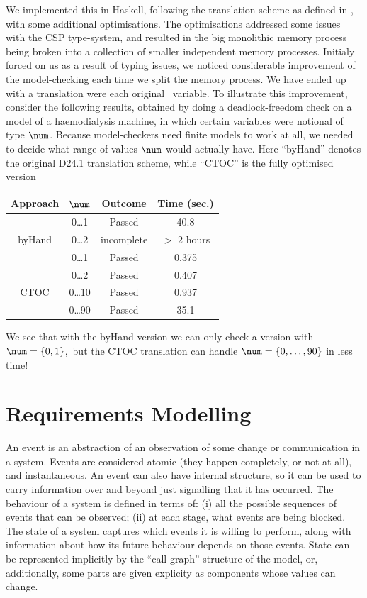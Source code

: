 We  implemented this in Haskell,
following the translation scheme as defined in \cite{compassd241},
with some additional optimisations.
The optimisations addressed some issues with the CSP type-system,
and resulted in the big monolithic memory process being broken
into a collection of smaller independent memory processes.
Initialy forced on us as a result of typing issues,
we noticed considerable improvement of the model-checking
each time we split the memory process.
We have ended up with a translation were each original \Circus\ variable.
To illustrate this improvement,
consider the following results,
obtained by doing a deadlock-freedom check on a model of a haemodialysis
machine, in which certain variables were notional of type $\num$.
Because model-checkers need finite models to work at all,
we needed to decide what range of values $\num$ would actually have.
Here ``byHand'' denotes the original D24.1 translation scheme,
while ``CTOC'' is the fully optimised version

\begin{tabular}{|c|c|c|c|}
\hline
   Approach & $\num$ & Outcome & Time (sec.)
\\\hline\hline
          & 0\dots1 & Passed & 40.8
\\\hline
  byHand  & 0\dots2 & incomplete & $>$ 2 hours
\\\hline\hline
          & 0\dots1 & Passed & 0.375
\\\hline
          & 0\dots2 & Passed & 0.407
\\\hline
  CTOC    & 0\dots10 & Passed & 0.937
\\\hline
          & 0\dots90 & Passed & 35.1
\\\hline
\end{tabular}

We see that with the byHand version we can only check a version
with $\num = \{0,1\}$,\
but the CTOC translation can handle $\num=\{0,\dots,90\}$
in less time!


\section{Requirements Modelling}

An event is an abstraction of an observation of some change
or communication in a system. Events are considered atomic
(they happen completely, or not at all), and instantaneous.
An event can also have internal structure,
so it can be used to carry information over and beyond
just signalling that it has occurred.
The behaviour of a system is defined in terms of:
(i) all the possible sequences of events that can be observed;
(ii) at each stage, what events are being blocked.
The state of a system captures which events it is willing to perform,
along with information about how its future behaviour depends on those events.
State can be represented implicitly by the ``call-graph'' structure of the model,
or, additionally,
some parts are given explicity as components whose values can change.

